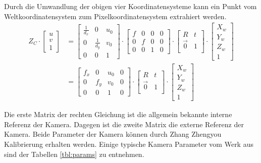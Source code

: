 Durch die Umwandlung der obigen vier Koordinatensysteme kann ein Punkt vom Weltkoordinatensystem zum Pixelkoordinatensystem extrahiert werden.
\begin{equation}
\begin{split}
   Z_C \cdot \begin{bmatrix}
	u \\  
	v \\
	1
	\end{bmatrix} & = \begin{bmatrix}
	\frac{1}{d_x} 			& 0 			& u_0	\\
	0	 					& \frac{1}{d_y} & v_0	\\
	0     					& 0 			& 1	
	\end{bmatrix} \cdot \begin{bmatrix}
	f & 0 & 0 & 0	\\
	0 & f & 0 & 0	\\
	0 & 0 & 1 & 0	
	\end{bmatrix} \cdot \begin{bmatrix}
	R & t	\\
	\vec{0}	& 1 \\
	\end{bmatrix} \cdot \begin{bmatrix}
	X_w \\  
	Y_w \\
	Z_w \\
	1
	\end{bmatrix} \\
	& = \begin{bmatrix}
	f_x & 0 & u_0 & 0	\\
	0 & f_y & v_0 & 0	\\
	0 & 0 & 1 & 0	
	\end{bmatrix} \cdot \begin{bmatrix}
	R & t	\\
	\vec{0}	& 1 \\
	\end{bmatrix} \cdot \begin{bmatrix}
	X_w \\  
	Y_w \\
	Z_w \\
	1
	\end{bmatrix}
\end{split}	
\end{equation}

Die erste Matrix der rechten Gleichung ist die allgemein bekannte interne Referenz der Kamera. Dagegen ist die zweite Matrix die externe Referenz der Kamera. Beide Parameter der Kamera können durch Zhang Zhengyou \cite{zhangzhengyou} Kalibrierung erhalten werden. Einige typische Kamera Parameter vom Werk aus sind der Tabellen \ref{tbl:params} zu entnehmen.

